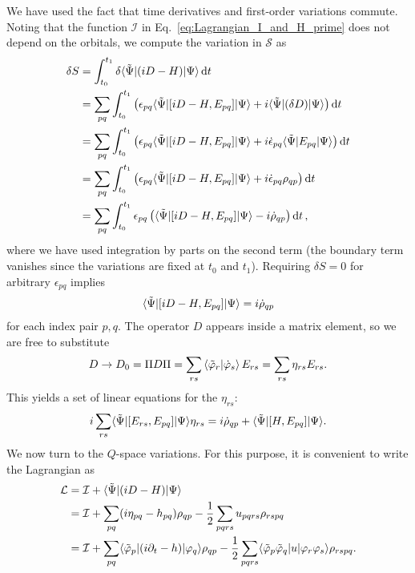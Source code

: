 \documentclass[aip,jcp,preprint,superscriptaddress,nofootinbib]{revtex4-1}
\begin{document}
We have used the fact that time derivatives and first-order variations commute.
Noting that the function $\mathcal{I}$ in Eq.~\eqref{eq:Lagrangian_I_and_H_prime} does not depend on the orbitals,
we compute the variation in $\mathcal{S}$ as
\begin{align}
    \delta{S} 
    &= \int_{t_0}^{t_1} \delta \langle \tilde{\Psi} \vert (iD - H) \vert \Psi \rangle \dd{t} \nonumber\\
    &= \sum_{pq} \int_{t_0}^{t_1} \left( \epsilon_{pq} \langle \tilde{\Psi} \vert [iD - H, E_{pq}] \vert \Psi \rangle + i \langle \tilde{\Psi} \vert (\delta D) \vert \Psi \rangle \right) \dd{t} \nonumber\\ 
    &= \sum_{pq} \int_{t_0}^{t_1} \left( \epsilon_{pq} \langle \tilde{\Psi} \vert [iD - H, E_{pq}] \vert \Psi \rangle + i \dot{\epsilon}_{pq} \langle \tilde{\Psi} \vert E_{{p} {q}} \vert \Psi \rangle \right) \dd{t} \nonumber\\ 
    &= \sum_{pq} \int_{t_0}^{t_1} \left( \epsilon_{pq} \langle \tilde{\Psi} \vert [iD - H, E_{pq}] \vert \Psi \rangle + i \dot{\epsilon}_{pq} \rho_{qp} \right) \dd{t} \nonumber\\ 
    &= \sum_{pq} \int_{t_0}^{t_1} \epsilon_{pq} \left( \langle \tilde{\Psi} \vert [iD - H, E_{pq}] \vert \Psi \rangle - i \dot{\rho}_{qp} \right) \dd{t},  \label{eq:P_space_variation_biorthogonal}
\end{align}
where we have used integration by parts on the second term (the boundary term vanishes since the variations are fixed at $t_0$ and $t_1$).
Requiring $\delta S = 0$ for arbitrary $\epsilon_{pq}$ implies
\begin{align}
    \langle \tilde{\Psi} \vert [iD - H, E_{pq}] \vert \Psi \rangle = i \dot{\rho}_{qp}
\end{align}
for each index pair $p,q$.
The operator $D$ appears inside a matrix element, so we are free to
substitute
\begin{align}
    D \rightarrow D_0 
    = \Pi D \Pi 
    = \sum_{rs} \braket{\tilde{\varphi}_{r} | \dot{\varphi}_{s}} E_{{r} {s}}
    = \sum_{rs} \eta_{rs} E_{{r} {s}}.
\end{align}
This yields a set of linear equations for the $\eta_{rs}$:
\begin{align}
    i \sum_{rs} \langle \tilde{\Psi} \vert [E_{{r} {s}}, E_{{p} {q}}] \vert \Psi \rangle \eta_{rs} = i \dot{\rho}_{qp} + \langle \tilde{\Psi} \vert [H, E_{pq}] \vert \Psi \rangle.
\end{align}
We now turn to the $Q$-space variations. For this purpose,
it is convenient to write the Lagrangian as
\begin{align} \label{eq:Lagrangian_for_Q_space_variation}
    \mathcal{L} 
    &= \mathcal{I} + \langle \tilde{\Psi} \vert (iD - H) \vert \Psi \rangle \nonumber\\
    &= \mathcal{I} + \sum_{pq} (i \eta_{pq} - h_{pq}) \rho_{qp} - \frac{1}{2} \sum_{pqrs} u_{pqrs} \rho_{rspq} \nonumber\\
    &= \mathcal{I} +
    \sum_{pq} \langle \tilde{\varphi}_{p} \vert (i \partial_t - h) \vert \varphi_{q} \rangle \rho_{qp} 
    - \frac{1}{2} \sum_{pqrs} \langle \tilde{\varphi}_{p} \tilde{\varphi}_{q} \vert u \vert \varphi_{r} \varphi_{s} \rangle \rho_{rspq}.
\end{align}
\end{document}

